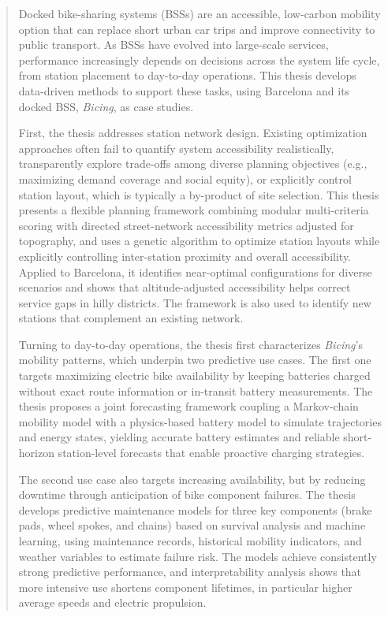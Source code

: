 \begin{abstract}

    Docked bike-sharing systems (BSSs) are an accessible, low-carbon mobility option that can replace short urban car trips and improve connectivity to public transport. As BSSs have evolved into large-scale services, performance increasingly depends on decisions across the system life cycle, from station placement to day-to-day operations. This thesis develops data-driven methods to support these tasks, using Barcelona and its docked BSS, \textit{Bicing}, as case studies.

    First, the thesis addresses station network design. Existing optimization approaches often fail to quantify system accessibility realistically, transparently explore trade-offs among diverse planning objectives (e.g., maximizing demand coverage and social equity), or explicitly control station layout, which is typically a by-product of site selection. This thesis presents a flexible planning framework combining modular multi-criteria scoring with directed street-network accessibility metrics adjusted for topography, and uses a genetic algorithm to optimize station layouts while explicitly controlling inter-station proximity and overall accessibility. Applied to Barcelona, it identifies near-optimal configurations for diverse scenarios and shows that altitude-adjusted accessibility helps correct service gaps in hilly districts. The framework is also used to identify new stations that complement an existing network.
    
    Turning to day-to-day operations, the thesis first characterizes \textit{Bicing}’s mobility patterns, which underpin two predictive use cases. The first one targets maximizing electric bike availability by keeping batteries charged without exact route information or in-transit battery measurements. The thesis proposes a joint forecasting framework coupling a Markov-chain mobility model with a physics-based battery model to simulate trajectories and energy states, yielding accurate battery estimates and reliable short-horizon station-level forecasts that enable proactive charging strategies.
    
    The second use case also targets increasing availability, but by reducing downtime through anticipation of bike component failures. The thesis develops predictive maintenance models for three key components (brake pads, wheel spokes, and chains) based on survival analysis and machine learning, using maintenance records, historical mobility indicators, and weather variables to estimate failure risk. The models achieve consistently strong predictive performance, and interpretability analysis shows that more intensive use shortens component lifetimes, in particular higher average speeds and electric propulsion.
    

\end{abstract}
